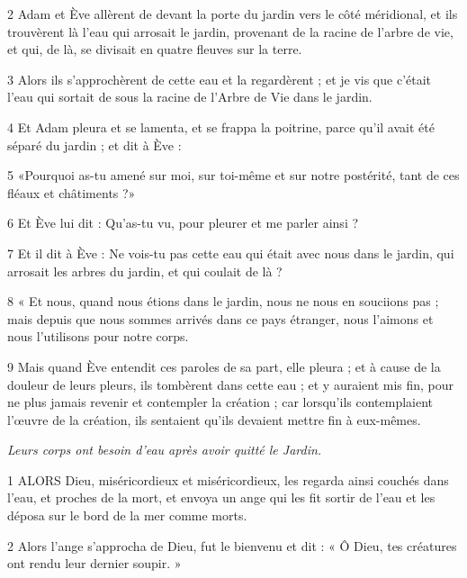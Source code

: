 \par 2 Adam et Ève allèrent de devant la porte du jardin vers le côté méridional, et ils trouvèrent là l'eau qui arrosait le jardin, provenant de la racine de l'arbre de vie, et qui, de là, se divisait en quatre fleuves sur la terre.

\par 3 Alors ils s'approchèrent de cette eau et la regardèrent ; et je vis que c'était l'eau qui sortait de sous la racine de l'Arbre de Vie dans le jardin.

\par 4 Et Adam pleura et se lamenta, et se frappa la poitrine, parce qu'il avait été séparé du jardin ; et dit à Ève :

\par 5 «Pourquoi as-tu amené sur moi, sur toi-même et sur notre postérité, tant de ces fléaux et châtiments ?»

\par 6 Et Ève lui dit : Qu'as-tu vu, pour pleurer et me parler ainsi ?

\par 7 Et il dit à Ève : Ne vois-tu pas cette eau qui était avec nous dans le jardin, qui arrosait les arbres du jardin, et qui coulait de là ?

\par 8 « Et nous, quand nous étions dans le jardin, nous ne nous en souciions pas ; mais depuis que nous sommes arrivés dans ce pays étranger, nous l’aimons et nous l’utilisons pour notre corps.

\par 9 Mais quand Ève entendit ces paroles de sa part, elle pleura ; et à cause de la douleur de leurs pleurs, ils tombèrent dans cette eau ; et y auraient mis fin, pour ne plus jamais revenir et contempler la création ; car lorsqu'ils contemplaient l'œuvre de la création, ils sentaient qu'ils devaient mettre fin à eux-mêmes.


\par \textit{Leurs corps ont besoin d'eau après avoir quitté le Jardin.}

\par 1 ALORS Dieu, miséricordieux et miséricordieux, les regarda ainsi couchés dans l'eau, et proches de la mort, et envoya un ange qui les fit sortir de l'eau et les déposa sur le bord de la mer comme morts.

\par 2 Alors l'ange s'approcha de Dieu, fut le bienvenu et dit : « Ô Dieu, tes créatures ont rendu leur dernier soupir. »

